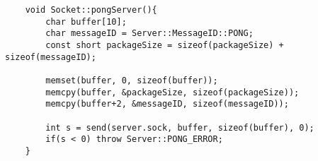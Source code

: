 \begin{lstlisting}
	void Socket::pongServer(){
		char buffer[10];
		char messageID = Server::MessageID::PONG;
		const short packageSize = sizeof(packageSize) + sizeof(messageID);

		memset(buffer, 0, sizeof(buffer));
		memcpy(buffer, &packageSize, sizeof(packageSize));
		memcpy(buffer+2, &messageID, sizeof(messageID));

		int s = send(server.sock, buffer, sizeof(buffer), 0);
		if(s < 0) throw Server::PONG_ERROR;
	}
\end{lstlisting}
